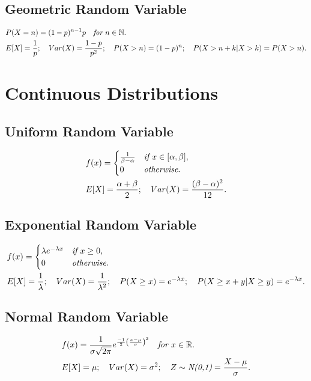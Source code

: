 \documentclass{article}
\begin{document}
\subsection{Geometric Random Variable}
\begin{align*}
    & P(X=n) = (1-p)^{n-1}p \quad \emph{for } n \in \mathbb{N}. \\
    & E[X] = \frac{1}{p}; \quad Var(X) = \frac{1-p}{p^2}; \quad P(X > n) = (1-p)^n ; \quad P(X>n+k|X>k) = P(X>n).
\end{align*}

\newpage
\section{Continuous Distributions}
\subsection{Uniform Random Variable}
\begin{align*}
    & f(x) = \begin{cases}
        \frac{1}{\beta-\alpha} & \emph{if $x \in [\alpha, \beta]$}, \\
        0 & \emph{otherwise}.
    \end{cases} \\
    & E[X] = \frac{\alpha+\beta}{2}; \quad Var(X) = \frac{(\beta-\alpha)^2}{12}.
\end{align*}

\subsection{Exponential Random Variable}
\begin{align*}
    & f(x) = \begin{cases}
        \lambda e^{-\lambda x} & \emph{if $x \ge 0$}, \\
        0 & \emph{otherwise}.
    \end{cases} \\
    & E[X] = \frac{1}{\lambda}; \quad Var(X) = \frac{1}{\lambda^2}; \quad P(X\ge x) = e^{-\lambda x}; \quad P(X\ge x + y|X\ge y) = e^{-\lambda x}.
\end{align*}

\subsection{Normal Random Variable}
\begin{align*}
    & f(x) = \frac{1}{\sigma\sqrt{2\pi}} e^{\frac{-1}{2}\left(\frac{x-\mu}{\sigma}\right)^2} \quad \emph{for $x\in \mathbb{R}$}. \\
    & E[X] = \mu; \quad Var(X) = \sigma^2; \quad Z \sim \emph{N(0,1)} = \frac{X-\mu}{\sigma}.
\end{align*}
\end{document}
